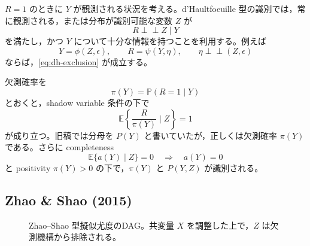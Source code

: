 \documentclass[dvipdfmx,autodetect-engine]{jsarticle}
\newcommand{\indep}{\mathrel{\perp\!\!\!\perp}}
\newcommand{\E}{\mathbb{E}}
\newcommand{\Prb}{\mathbb{P}}
\newcommand{\1}{\mathbf{1}}
\begin{document}
$R=1$ のときに $Y$ が観測される状況を考える。d'Haultfoeuille 型の識別では，常に観測される，または分布が識別可能な変数 $Z$ が
\begin{equation}
  R\indep Z\mid Y
  \label{eq:dh-exclusion}
\end{equation}
を満たし，かつ $Y$ について十分な情報を持つことを利用する。例えば
\begin{equation}
  Y=\phi(Z,\epsilon),\qquad R=\psi(Y,\eta),\qquad \eta\indep (Z,\epsilon)
\end{equation}
ならば，\eqref{eq:dh-exclusion} が成立する。

欠測確率を
\begin{equation}
  \pi(Y)=\Prb(R=1\mid Y)
\end{equation}
とおくと，shadow variable 条件の下で
\begin{equation}
  \E\left\{\frac{R}{\pi(Y)}\mid Z\right\}=1
  \label{eq:dh-correct-moment}
\end{equation}
が成り立つ。旧稿では分母を $P(Y)$ と書いていたが，正しくは欠測確率 $\pi(Y)$ である。さらに completeness
\begin{equation}
  \E\{a(Y)\mid Z\}=0 \quad\Rightarrow\quad a(Y)=0
  \label{eq:dh-completeness}
\end{equation}
と positivity $\pi(Y)>0$ の下で，$\pi(Y)$ と $P(Y,Z)$ が識別される。

\subsection{Zhao \& Shao (2015)}

\begin{figure}[tbp]
\centering
{}
\caption{Zhao--Shao 型擬似尤度のDAG。共変量 $X$ を調整した上で，$Z$ は欠測機構から排除される。}
\label{fig:dag-zhao-shao}
\end{figure}
\end{document}
